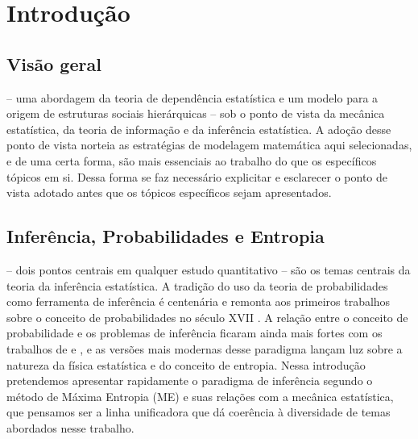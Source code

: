 \chapter{Introdução}

\section{Visão geral}
 -- uma abordagem da teoria de dependência estatística e um modelo para a origem de estruturas sociais hierárquicas -- sob o ponto de vista da mecânica estatística, da teoria de informação e da inferência estatística. A adoção desse ponto de vista norteia as estratégias de modelagem matemática aqui selecionadas, e de uma certa forma, são mais essenciais ao trabalho do que os específicos tópicos em si. Dessa forma se faz necessário explicitar e esclarecer o ponto de vista adotado antes que os tópicos específicos sejam apresentados. 

\section{Inferência, Probabilidades e Entropia}
\label{sec:inferencia}

 -- dois pontos centrais em qualquer estudo quantitativo -- são os temas centrais da teoria da inferência estatística. A tradição do uso da teoria de probabilidades como ferramenta de inferência é centenária e remonta aos primeiros trabalhos sobre o conceito de probabilidades no século XVII \sourcesneeded. A relação entre o conceito de probabilidade e os problemas de inferência ficaram ainda mais fortes com os trabalhos de \citet{Cox1946}\cite[-9cm]{Cox1946,Cox1961} e \citet{Shannon1948}\cite[-5.75cm]{Shannon1948}, e as versões mais modernas desse paradigma\cite[-5cm]{Jaynes2003,ACaticha2008,ACaticha2009} lançam luz sobre a natureza da física estatística e do conceito de entropia. Nessa introdução pretendemos apresentar rapidamente o paradigma de inferência segundo o método de Máxima Entropia (ME) e suas relações com a mecânica estatística, que pensamos ser a linha unificadora que dá coerência à diversidade de temas abordados nesse trabalho. 

